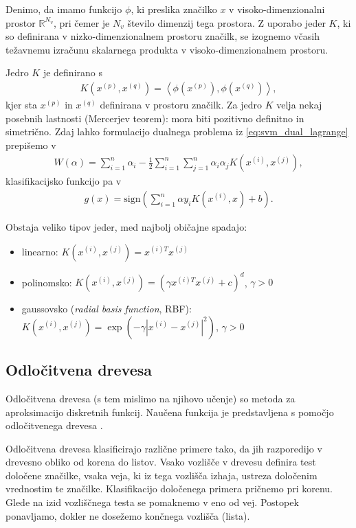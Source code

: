 \documentclass[11pt,a4paper,openany]{book}
\begin{document}
Denimo, da imamo funkcijo $\phi$, ki preslika značilko $x$ v visoko-dimenzionalni prostor $\mathbb{R}^{N_v}$, pri čemer je $N_v$ število dimenzij tega prostora. Z uporabo jeder $K$, ki so definirana v nizko-dimenzionalnem prostoru značilk, se izognemo včasih težavnemu izračunu skalarnega produkta v visoko-dimenzionalnem prostoru.

Jedro $K$ je definirano s
\begin{eqnarray}
	K(x^{(p)}, x^{(q)}) = \left<\phi(x^{(p)}), \phi(x^{(q)})\right>,
\end{eqnarray}
kjer sta $x^{(p)}$ in $x^{(q)}$ definirana v prostoru značilk. Za jedro $K$ velja nekaj posebnih lastnosti (Mercerjev teorem): mora biti pozitivno definitno in simetrično. Zdaj lahko formulacijo dualnega problema iz \ref{eq:svm_dual_lagrange} prepišemo v 
\begin{eqnarray}
	W(\alpha) = \sum^n_{i = 1}\alpha_i - \frac{1}{2} \sum^n_{i=1} \sum^n_{j=1} \alpha_i \alpha_j K(x^{(i)}, x^{(j)}),
\end{eqnarray}
klasifikacijsko funkcijo pa v
\begin{eqnarray}
	g(x) = \text{sign} \left(\sum^n_{i=1}\alpha y_i K(x^{(i)}, x) + b \right).
\end{eqnarray}

\noindent Obstaja veliko tipov jeder, med najbolj običajne spadajo:
\begin{itemize}
	\item linearno: $K(x^{(i)}, x^{(j)}) = x^{(i)T}x^{(j)}$
	\item polinomsko: $K(x^{(i)}, x^{(j)}) = (\gamma x^{(i)T}x^{(j)} + c)^d$, $\gamma > 0$ 
	\item gaussovsko (\textit{radial basis function}, RBF): $K(x^{(i)}, x^{(j)}) = \exp(-\gamma |x^{(i)}-x^{(j)}|^2)$, $\gamma > 0$ 
\end{itemize}

\subsection{Odločitvena drevesa}
\label{sc:decisiontrees}
Odločitvena drevesa (s tem mislimo na njihovo učenje) so metoda za aproksimacijo diskretnih funkcij. Naučena funkcija je predstavljena s pomočjo odločitvenega drevesa \cite{Mitchell1997}. 

Odločitvena drevesa klasificirajo različne primere tako, da jih razporedijo v drevesno obliko od korena do listov. Vsako vozlišče v drevesu definira test določene značilke, vsaka veja, ki iz tega vozlišča izhaja, ustreza določenim vrednostim te značilke. Klasifikacijo določenega primera pričnemo pri korenu. Glede na izid vozliščnega testa se pomaknemo v eno od vej. Postopek ponavljamo, dokler ne dosežemo končnega vozlišča (lista).
\end{document}
